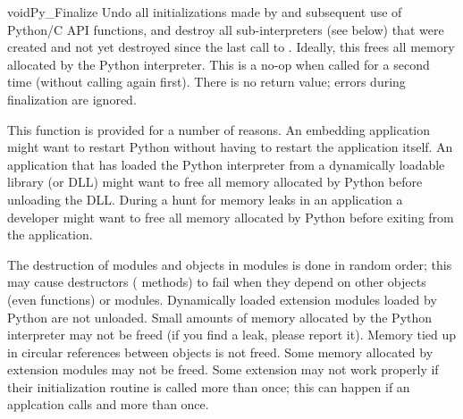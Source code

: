 \documentclass{manual}
\begin{document}
\begin{cfuncdesc}{void}{Py_Finalize}{}
Undo all initializations made by  and
subsequent use of Python/C API functions, and destroy all
sub-interpreters (see  below) that were
created and not yet destroyed since the last call to
.  Ideally, this frees all memory allocated
by the Python interpreter.  This is a no-op when called for a second
time (without calling  again first).  There
is no return value; errors during finalization are ignored.

This function is provided for a number of reasons.  An embedding 
application might want to restart Python without having to restart the 
application itself.  An application that has loaded the Python 
interpreter from a dynamically loadable library (or DLL) might want to 
free all memory allocated by Python before unloading the DLL. During a 
hunt for memory leaks in an application a developer might want to free 
all memory allocated by Python before exiting from the application.

 The destruction of modules and objects in 
modules is done in random order; this may cause destructors 
( methods) to fail when they depend on other objects 
(even functions) or modules.  Dynamically loaded extension modules 
loaded by Python are not unloaded.  Small amounts of memory allocated 
by the Python interpreter may not be freed (if you find a leak, please 
report it).  Memory tied up in circular references between objects is 
not freed.  Some memory allocated by extension modules may not be 
freed.  Some extension may not work properly if their initialization 
routine is called more than once; this can happen if an applcation 
calls  and  more
than once.
\end{cfuncdesc}
\end{document}
